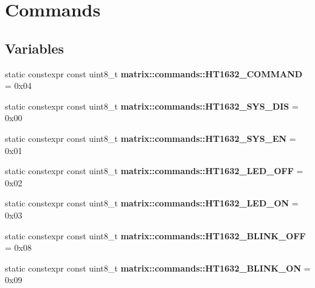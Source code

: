 \hypertarget{group__commands}{}\section{Commands}
\label{group__commands}
\subsection*{Variables}
\begin{DoxyCompactItemize}
\item 
\mbox{\label{group__commands_ga5e1cac3e0d12033d41130455d66775e8}} 
static constexpr const uint8\+\_\+t {\bfseries matrix\+::commands\+::\+H\+T1632\+\_\+\+C\+O\+M\+M\+A\+ND} = 0x04
\item 
\mbox{\label{group__commands_gaa2b1fbf1b3ed91055aa2353a3a368757}} 
static constexpr const uint8\+\_\+t {\bfseries matrix\+::commands\+::\+H\+T1632\+\_\+\+S\+Y\+S\+\_\+\+D\+IS} = 0x00
\item 
\mbox{\label{group__commands_gabcb7a53af114e145184d539ba719ee8c}} 
static constexpr const uint8\+\_\+t {\bfseries matrix\+::commands\+::\+H\+T1632\+\_\+\+S\+Y\+S\+\_\+\+EN} = 0x01
\item 
\mbox{\label{group__commands_ga13dfca433ba028c826eda716504fc4bb}} 
static constexpr const uint8\+\_\+t {\bfseries matrix\+::commands\+::\+H\+T1632\+\_\+\+L\+E\+D\+\_\+\+O\+FF} = 0x02
\item 
\mbox{\label{group__commands_gad9012bf9a8af6a344604b0599e34b1be}} 
static constexpr const uint8\+\_\+t {\bfseries matrix\+::commands\+::\+H\+T1632\+\_\+\+L\+E\+D\+\_\+\+ON} = 0x03
\item 
\mbox{\label{group__commands_ga815b216f9994583dbe8f01ac21410a0a}} 
static constexpr const uint8\+\_\+t {\bfseries matrix\+::commands\+::\+H\+T1632\+\_\+\+B\+L\+I\+N\+K\+\_\+\+O\+FF} = 0x08
\item 
\mbox{\label{group__commands_ga3592c1239023b4fd015bbca76babaa79}} 
static constexpr const uint8\+\_\+t {\bfseries matrix\+::commands\+::\+H\+T1632\+\_\+\+B\+L\+I\+N\+K\+\_\+\+ON} = 0x09
\item 

\end{DoxyCompactItemize}
